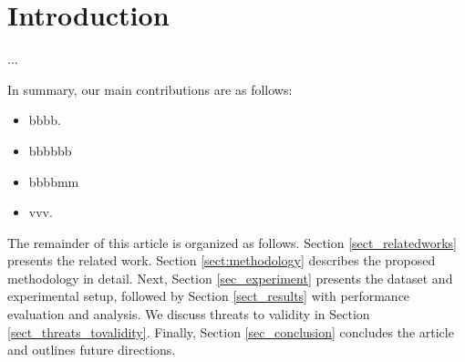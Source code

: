 \section{Introduction} \label{sec_introduction}
...

In summary, our main contributions are as follows:
\begin{itemize}
\item bbbb.
\item bbbbbb
\item bbbbmm
\item vvv.
\end{itemize}

The remainder of this article is organized as follows. Section \ref{sect_relatedworks} presents the related work. Section \ref{sect:methodology} describes the proposed methodology in detail. Next, Section \ref{sec_experiment} presents the dataset and experimental setup, followed by Section \ref{sect_results} with performance evaluation and analysis. We discuss threats to validity in Section \ref{sect_threats_tovalidity}. Finally, Section \ref{sec_conclusion} concludes the article and outlines future directions.


